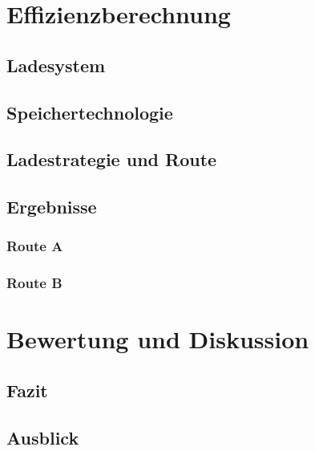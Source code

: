 \documentclass[twoside]{scrreprt}
\begin{document}
\chapter{Effizienzberechnung} %
\section{Ladesystem}
\section{Speichertechnologie}
\section{Ladestrategie und Route}
\section{Ergebnisse}
\subsection{Route A}
\subsection{Route B}

\chapter{Bewertung und Diskussion} %
\section{Fazit}
\section{Ausblick}




 
\end{document}
